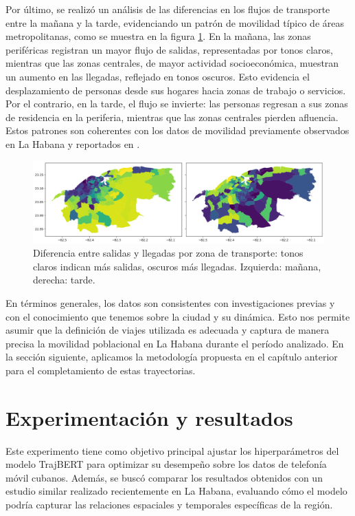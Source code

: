 Por último, se realizó un análisis de las diferencias en los flujos de transporte entre la mañana y la tarde, evidenciando un patrón de movilidad típico de áreas metropolitanas, como se muestra en la figura \ref{fig:morning_afternoon_difference_coulor}. En la mañana, las zonas periféricas registran un mayor flujo de salidas, representadas por tonos claros, mientras que las zonas centrales, de mayor actividad socioeconómica, muestran un aumento en las llegadas, reflejado en tonos oscuros. Esto evidencia el desplazamiento de personas desde sus hogares hacia zonas de trabajo o servicios. Por el contrario, en la tarde, el flujo se invierte: las personas regresan a sus zonas de residencia en la periferia, mientras que las zonas centrales pierden afluencia. Estos patrones son coherentes con los datos de movilidad previamente observados en La Habana y reportados en \cite{padron2021transporte}.

\begin{figure}[!htb] \centering \includegraphics[width=1\textwidth]{Graphics/morning_afternoon_difference_coulor.png} \caption{Diferencia entre salidas y llegadas por zona de transporte: tonos claros indican más salidas, oscuros más llegadas. Izquierda: mañana, derecha: tarde.} \label{fig:morning_afternoon_difference_coulor} 
\end{figure}

En términos generales, los datos son consistentes con investigaciones previas y con el conocimiento que tenemos sobre la ciudad y su dinámica. Esto nos permite asumir que la definición de viajes utilizada es adecuada y captura de manera precisa la movilidad poblacional en La Habana durante el período analizado. En la sección siguiente, aplicamos la metodología propuesta en el capítulo anterior para el completamiento de estas trayectorias.

\section{Experimentación y resultados}

Este experimento tiene como objetivo principal ajustar los hiperparámetros del modelo TrajBERT para optimizar su desempeño sobre los datos de telefonía móvil cubanos. Además, se buscó comparar los resultados obtenidos con un estudio similar realizado recientemente en La Habana, evaluando cómo el modelo podría capturar las relaciones espaciales y temporales específicas de la región.

